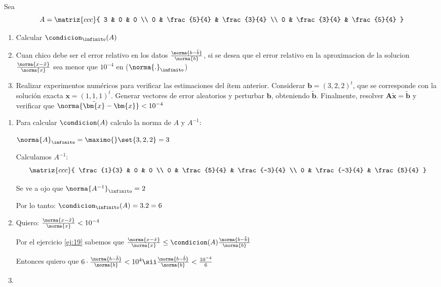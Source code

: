 \begin{enunciado}{\ejercicio}
  Sea
  $$
    A =
    \matriz{ccc}{
      3 & 0 & 0 \\
      0 & \frac{5}{4} & \frac{3}{4} \\
      0 & \frac{3}{4} & \frac{5}{4}
    }$$
  \begin{enumerate}[label=(\alph*)]
    \item Calcular $\condicion_\infinito(A)$
    \item
          Cuan chico debe ser el error relativo en los datos $\frac{\norma{b-\tilde{b}}}{\norma{b}}$, si se desea que el error relativo en
          la aproximacion de la solucion $\frac{\norma{x-\tilde{x}}}{\norma{x}}$ sea menor que $10^{-4}$ en ($\norma{.}_\infinito$)

    \item Realizar experimentos numéricos para verificar las estimaciones del ítem anterior. Considerar $\bm{b} = (3,2,2)^t$, que se corresponde
          con la solución exacta $\bm{x} = (1,1,1)^t$. Generar vectores de error aleatorios y perturbar $\bm{b}$, obteniendo $\tilde{\bm{b}}$.
          Finalmente, resolver $\bm{A}\bm{\tilde{x}} = \tilde{\bm{b}}$ y verificar que $\norma{\tilde{\bm{x}} - \bm{x}} < 10^{-4}$
  \end{enumerate}

\end{enunciado}

\medskip
\begin{enumerate}[label=(\alph*)]
  \item Para calcular $\condicion(A)$ calculo la norma de $A$ y $A^{-1}$:

        $\norma{A}_\infinito = \maximo{}\set{3,2,2} = 3$

        Calculamos $A^{-1}$:
        $$
          \matriz{ccc}{
            \frac{1}{3} & 0 & 0 \\
            0 & \frac{5}{4} & \frac{-3}{4} \\
            0 & \frac{-3}{4} & \frac{5}{4}
          }
        $$

        Se ve a ojo que $\norma{A^{-1}}_\infinito = 2 $

        Por lo tanto: $\condicion_\infinito(A) = 3.2 = 6$

  \item
        Quiero: $\frac{\norma{x - \tilde{x}}}{\norma{x}} < 10^{-4}$

        Por el ejercicio \ref{ej:19} sabemos que $\frac{\norma{x-\tilde{x}}}{\norma{x}} \leq \condicion(A) \frac{\norma{b-\tilde{b}}}{\norma{b}}$

        Entonces quiero que $6 \cdot \frac{\norma{b-\tilde{b}}}{\norma{b}} < 10^4
          \sii
          \frac{\norma{b-\tilde{b}}}{\norma{b}} < \frac{10^{-4}}{6}$

  \item \hacer
\end{enumerate}

\begin{aportes}
  \item {}
\end{aportes}
